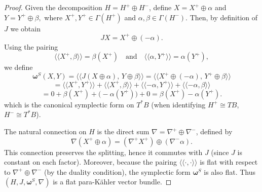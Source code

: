 \documentclass[10pt,a4paper]{amsart}
\begin{document}
    \begin{proof}
Given the decomposition $H = H^+ \oplus H^-$, define $X = X^+ \oplus \alpha$ and $Y = Y^+ \oplus \beta,$ where $X^+, Y^+ \in \Gamma(H^+)$ and $\alpha, \beta \in \Gamma(H^-)$. Then,
by definition of $J$ we obtain \[
JX = X^+ \oplus (-\alpha).
\]
Using the pairing
\[
\langle\!\langle X^+, \beta \rangle\!\rangle = \beta(X^+)
\quad \text{and} \quad
\langle\!\langle \alpha, Y^+ \rangle\!\rangle = \alpha(Y^+),
\]
we define  $$\boldsymbol{\omega}^S(X,Y)=\langle\!\langle 
 J(X \oplus \alpha),\, Y \oplus \beta \rangle\!\rangle
= \langle\!\langle X^+ \oplus (-\alpha),\, Y^+ \oplus \beta \rangle\!\rangle$$ \[
= \langle\!\langle X^+, Y^+ \rangle\!\rangle
+ \langle\!\langle X^+, \beta \rangle\!\rangle
+ \langle\!\langle -\alpha, Y^+ \rangle\!\rangle
+ \langle\!\langle -\alpha, \beta \rangle\!\rangle
\]
\[
= 0 + \beta(X^+) + \bigl(-\alpha(Y^+)\bigr) + 0
= \beta(X^+) - \alpha(Y^+).
\] which is the canonical symplectic form on $T^*B$ (when identifying $H^+ \cong TB$, $H^- \cong T^*B$).



The natural connection on $H$ is the direct sum $\nabla = \nabla^+ \oplus \nabla^-$, defined by
\[
\nabla(X^+ \oplus \alpha) = (\nabla^+ X^+) \oplus (\nabla^- \alpha).
\]
This connection preserves the splitting, hence it commutes with $J$ (since $J$ is constant on each factor). Moreover, because the pairing $\langle\!\langle \cdot, \cdot \rangle\!\rangle$ is flat with respect to $\nabla^+ \oplus \nabla^-$ (by the duality condition), the symplectic form $\boldsymbol{\omega}^S$ is also flat. Thus $(H, J, \boldsymbol{\omega}^S, \nabla)$ is a flat para-Kähler vector bundle.

    \end{proof}
\end{document}
